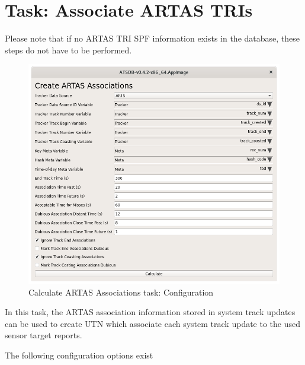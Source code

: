 \section{Task: Associate ARTAS TRIs}
\label{sec:task_associate_artas_tris}

Please note that if no ARTAS TRI SPF information exists in the database, these steps do not have to be performed.\\

\begin{figure}[H]
  \center
    \includegraphics[width=12cm]{../screenshots/artas_association_config.png}
  \caption{Calculate ARTAS Associations task: Configuration}
\end{figure}

In this task, the ARTAS association information stored in system track updates can be used to create UTN which associate each system track update to the used sensor target reports.

The following configuration options exist

